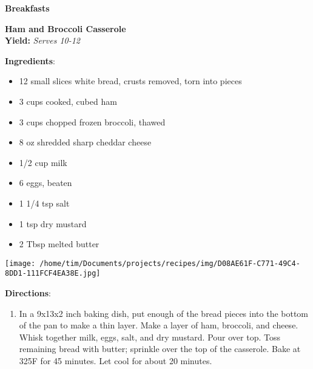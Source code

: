 \documentclass[11pt, twoside, openany]{book}
\begin{document}
{\newpage \LARGE \textbf{Breakfasts}} \label{breakfasts}\\
\noindent\begin{minipage}[t]{\linewidth}%
{\Large\textbf{Ham and Broccoli Casserole}} \label{ham-and-broccoli-casserole}\hfill\textit{}\\
\textbf{Yield:} \textit{Serves 10-12}\\
\noindent\begin{minipage}[t]{0.78\linewidth}%
\textbf{Ingredients}:\vspace{-3mm}
\begin{multicols}{2}
\begin{itemize}\setlength\itemsep{-1mm}
\item 12 small slices white bread, crusts removed, torn into pieces
\item 3 cups cooked, cubed ham
\item 3 cups chopped frozen broccoli, thawed
\item 8 oz shredded sharp cheddar cheese
\item 1/2 cup milk
\item 6 eggs, beaten
\item 1 1/4 tsp salt
\item 1 tsp dry mustard
\item 2 Tbsp melted butter
\end{itemize}
\end{multicols}
\end{minipage}
\noindent\begin{minipage}[t]{0.18\linewidth}
\centering \strut\vspace*{-\baselineskip}\newline
\texttt{[image: /home/tim/Documents/projects/recipes/img/D08AE61F-C771-49C4-8DD1-111FCF4EA38E.jpg]}\\
\end{minipage}\vspace{3mm}
\textbf{Directions}:
\vspace{-3mm}\begin{enumerate}\setlength\itemsep{-1mm}
\item In a 9x13x2 inch baking dish, put enough of the bread pieces into the bottom of the pan to make a thin layer. Make a layer of ham, broccoli, and cheese. Whisk together milk, eggs, salt, and dry mustard. Pour over top. Toss remaining bread with butter; sprinkle over the top of the casserole. Bake at 325F for 45 minutes. Let cool for about 20 minutes.
\end{enumerate}
\end{minipage}\vspace{8mm}
\end{document}
